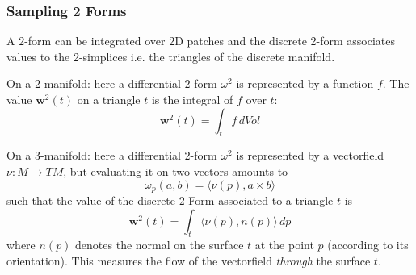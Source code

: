 \subsubsection{Sampling 2 Forms}
A $2$-form can be integrated over $2$D patches and the discrete 2-form associates values to the 2-simplices i.e. the triangles of the discrete manifold.

On a 2-manifold: here a differential $2$-form $\omega^2$ is represented by a function $f$. The value $\textbf{w}^2(t)$ on a triangle $t$ is the integral of $f$ over $t$:
\[\textbf{w}^2(t)= \int_{t} f\, dVol\]

On a 3-manifold: here a differential $2$-form $\omega^2$ is represented by a vectorfield $\nu: M\to TM$, but evaluating it on two vectors amounts to
\[\omega_p(a,b) = \langle \nu(p) , a \times b \rangle\]
such that the value of the discrete $2$-Form associated to a triangle $t$ is
\[\textbf{w}^2(t)= \int_{t} \langle \nu(p), n(p) \rangle \, dp\]
where $n(p)$ denotes the normal on the surface $t$ at the point $p$ (according to its orientation). This measures the flow of the vectorfield \emph{through} the surface $t$. 

%

